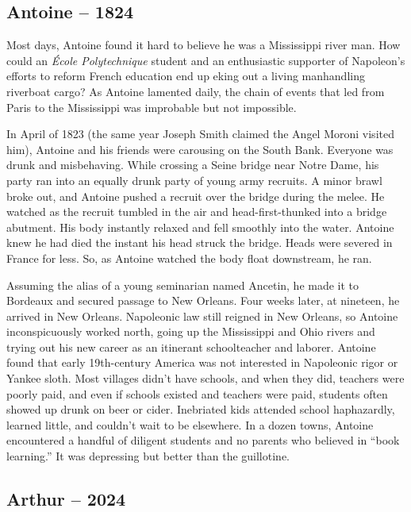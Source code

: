 \hypertarget{antoine-1824}{%
\subsection*{Antoine -- 1824}\label{antoine-1824}}

Most days, Antoine found it hard to believe he was a Mississippi river
man. How could an \emph{École Polytechnique} student and an enthusiastic
supporter of Napoleon's efforts to reform French education end up eking
out a living manhandling riverboat cargo? As Antoine lamented daily, the
chain of events that led from Paris to the Mississippi was improbable
but not impossible.

In April of 1823 (the same year Joseph Smith claimed the Angel Moroni
visited him), Antoine and his friends were carousing on the South Bank.
Everyone was drunk and misbehaving. While crossing a Seine bridge near
Notre Dame, his party ran into an equally drunk party of young army
recruits. A minor brawl broke out, and Antoine pushed a recruit over the
bridge during the melee. He watched as the recruit tumbled in the air
and head-first-thunked into a bridge abutment. His body instantly
relaxed and fell smoothly into the water. Antoine knew he had died the
instant his head struck the bridge. Heads were severed in France for
less. So, as Antoine watched the body float downstream, he ran.

Assuming the alias of a young seminarian named Ancetin, he made it to
Bordeaux and secured passage to New Orleans. Four weeks later, at
nineteen, he arrived in New Orleans. Napoleonic law still reigned in New
Orleans, so Antoine inconspicuously worked north, going up the
Mississippi and Ohio rivers and trying out his new career as an
itinerant schoolteacher and laborer. Antoine found that early
19th-century America was not interested in Napoleonic rigor or Yankee
sloth. Most villages didn't have schools, and when they did, teachers
were poorly paid, and even if schools existed and teachers were paid,
students often showed up drunk on beer or cider. Inebriated kids
attended school haphazardly, learned little, and couldn't wait to be
elsewhere. In a dozen towns, Antoine encountered a handful of diligent
students and no parents who believed in ``book learning.'' It was
depressing but better than the guillotine.

\hypertarget{arthur-2024-1}{%
\subsection*{Arthur -- 2024}\label{arthur-2024-1}}

